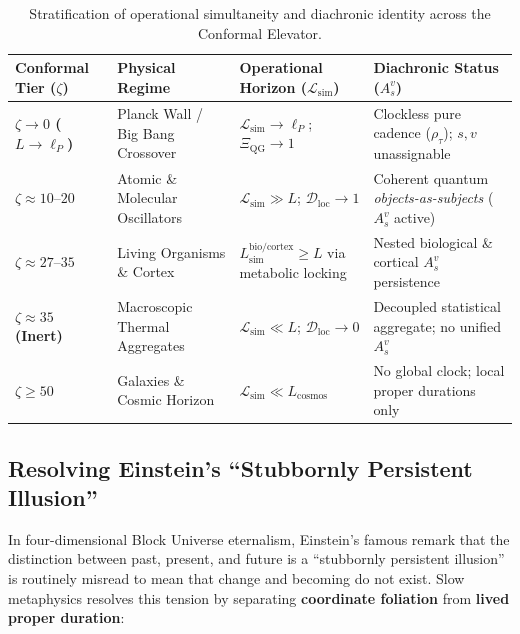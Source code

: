 \documentclass[11pt,a4paper]{article}
\begin{document}
\begin{table}[h!]
\centering
\small
\begin{tabularx}{\textwidth}{>{\bfseries}l l X X}
\toprule
Conformal Tier ($\zeta$) & Physical Regime & Operational Horizon ($\mathcal{L}_{\mathrm{sim}}$) & Diachronic Status ($A_s^v$) \\
\midrule
$\zeta \to 0$ ($L \to \ell_P$) & Planck Wall / Big Bang Crossover & $\mathcal{L}_{\mathrm{sim}} \to \ell_P$; $\Xi_{\mathrm{QG}} \to 1$ & Clockless pure cadence ($\rho_\tau$); $s, v$ unassignable \\
$\zeta \approx 10\text{--}20$ & Atomic \& Molecular Oscillators & $\mathcal{L}_{\mathrm{sim}} \gg L$; $\mathcal{D}_{\mathrm{loc}} \to 1$ & Coherent quantum \emph{objects-as-subjects} ($A_s^v$ active) \\
$\zeta \approx 27\text{--}35$ & Living Organisms \& Cortex & $L_{\mathrm{sim}}^{\mathrm{bio/cortex}} \ge L$ via metabolic locking & Nested biological \& cortical $A_s^v$ persistence \\
$\zeta \approx 35$ (Inert) & Macroscopic Thermal Aggregates & $\mathcal{L}_{\mathrm{sim}} \ll L$; $\mathcal{D}_{\mathrm{loc}} \to 0$ & Decoupled statistical aggregate; no unified $A_s^v$ \\
$\zeta \ge 50$ & Galaxies \& Cosmic Horizon & $\mathcal{L}_{\mathrm{sim}} \ll L_{\mathrm{cosmos}}$ & No global clock; local proper durations only \\
\bottomrule
\end{tabularx}
\caption{Stratification of operational simultaneity and diachronic identity across the Conformal Elevator.}
\end{table}

\subsection{Resolving Einstein's ``Stubbornly Persistent Illusion''}
In four-dimensional Block Universe eternalism, Einstein's famous remark that the distinction between past, present, and future is a ``stubbornly persistent illusion'' is routinely misread to mean that change and becoming do not exist. Slow metaphysics resolves this tension by separating \textbf{coordinate foliation} from \textbf{lived proper duration}:
\end{document}
